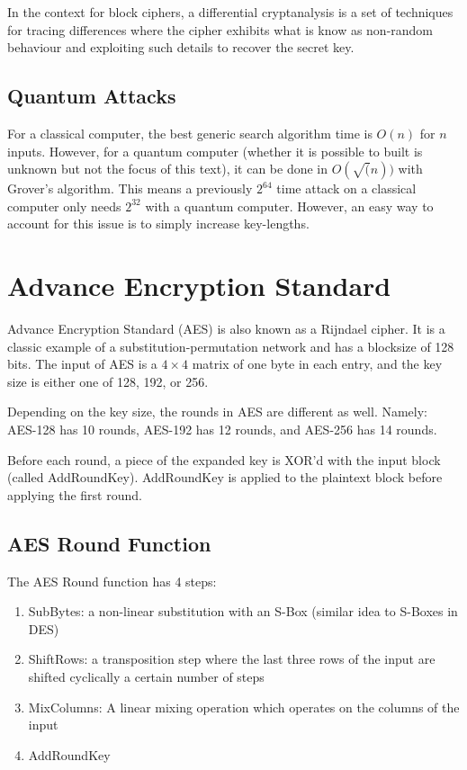 \documentclass{article}
\begin{document}
\begin{multicols}{2}
In the context for block ciphers, a differential cryptanalysis is a set of techniques for tracing differences where the cipher exhibits what is know as non-random behaviour and exploiting such details to recover the secret key.

\subsection{Quantum Attacks}

For a classical computer, the best generic search algorithm time is $O(n)$ for $n$ inputs. However, for a quantum computer (whether it is possible to built is unknown but not the focus of this text), it can be done in $O(\sqrt(n))$ with Grover's algorithm. This means a previously $2^{64}$ time attack on a classical computer only needs $2^{32}$ with a quantum computer. However, an easy way to 
account for this issue is to simply increase key-lengths.

\section{Advance Encryption Standard}

Advance Encryption Standard (AES) is also known as a Rijndael cipher. It is a classic example of a substitution-permutation network and has a blocksize of 128 bits. The input of AES is a $4 \times 4$ matrix of one byte in each entry, and the key size is either one of 128, 192, or 256. 

Depending on the key size, the rounds in AES are different as well. Namely: AES-128 has 10 rounds, AES-192 has 12 rounds, and AES-256 has 14 rounds. 

Before each round, a piece of the expanded key is XOR'd with the input block (called AddRoundKey). AddRoundKey is applied to the plaintext block before applying the first round. 

\subsection{AES Round Function}

The AES Round function has 4 steps:

\begin{enumerate}
    \item SubBytes: a non-linear substitution with an S-Box (similar idea to S-Boxes in DES)
    \item ShiftRows: a transposition step where the last three rows of the input are shifted cyclically a certain number of steps
    \item MixColumns: A linear mixing operation which operates on the columns of the input
    \item AddRoundKey 
\end{enumerate}


\end{multicols}
\end{document}
